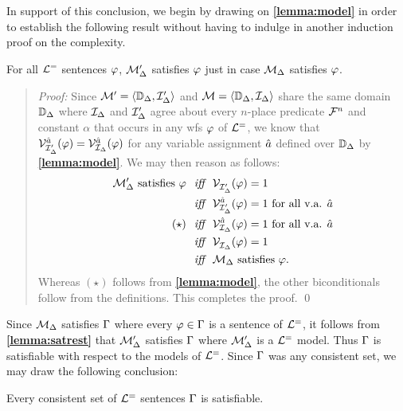 In support of this conclusion, we begin by drawing on \textbf{\ref{lemma:model}} in order to establish the following result without having to indulge in another induction proof on the complexity.

\begin{Lthm} \label{lemma:satrest}
  For all $\mathcal{L}^{=}$ sentences $\varphi$, $\mathcal{M}'_{\Delta}$ satisfies $\varphi$ just in case $\mathcal{M}_{\Delta}$ satisfies $\varphi$.
\end{Lthm}

\begin{quote} 
  \textit{Proof:}
  Since $\mathcal{M}'=\langle\mathbb{D}_{\Delta},\mathcal{I}_{\Delta}'\rangle$ and $\mathcal{M}=\langle\mathbb{D}_{\Delta},\mathcal{I}_{\Delta}\rangle$ share the same domain $\mathbb{D}_{\Delta}$ where $\mathcal{I}_{\Delta}$ and $\mathcal{I}'_{\Delta}$ agree about every $n$-place predicate $\mathcal{F}^n$ and constant $\alpha$ that occurs in any wfs $\varphi$ of $\mathcal{L}^{=}$, we know that $\mathcal{V}_{\mathcal{I}'_{\Delta}}^{\hat{a}}(\varphi) = \mathcal{V}_{\mathcal{I}_{\Delta}}^{\hat{a}}(\varphi)$ for any variable assignment $\hat{a}$ defined over $\mathbb{D}_{\Delta}$ by \textbf{\ref{lemma:model}}.
  We may then reason as follows:
  \begin{align*}
    \mathcal{M}'_{\Delta} \text{ satisfies } \varphi &\textit{ ~iff~ } \mathcal{V}_{\mathcal{I}'_{\Delta}}^{}(\varphi)=1\\
    &\textit{ ~iff~ } \mathcal{V}_{\mathcal{I}'_{\Delta}}^{\hat{a}}(\varphi)=1 \text{ for all v.a. } \hat{a}\\
    (\star) &\textit{ ~iff~ } \mathcal{V}_{\mathcal{I}_{\Delta}}^{\hat{a}}(\varphi)=1 \text{ for all v.a. } \hat{a}\\
    &\textit{ ~iff~ } \mathcal{V}_{\mathcal{I}_{\Delta}}^{}(\varphi)=1\\
    &\textit{ ~iff~ } \mathcal{M}_{\Delta} \text{ satisfies } \varphi.
  \end{align*}
  Whereas $(\star)$ follows from \textbf{\ref{lemma:model}}, the other biconditionals follow from the definitions.
  This completes the proof.
  \qed
\end{quote}

Since $\mathcal{M}_{\Delta}$ satisfies $\Gamma$ where every $\varphi\in\Gamma$ is a sentence of $\mathcal{L}^{=}$, it follows from \textbf{\ref{lemma:satrest}} that $\mathcal{M}'_{\Delta}$ satisfies $\Gamma$ where $\mathcal{M}'_{\Delta}$ is a $\mathcal{L}^{=}$ model. 
Thus $\Gamma$ is satisfiable with respect to the models of $\mathcal{L}^{=}$.
Since $\Gamma$ was any consistent set, we may draw the following conclusion:

  \begin{Tthm} \label{thm:comp}
    Every consistent set of $\mathcal{L}^{=}$ sentences $\Gamma$ is satisfiable. 
  \end{Tthm}

